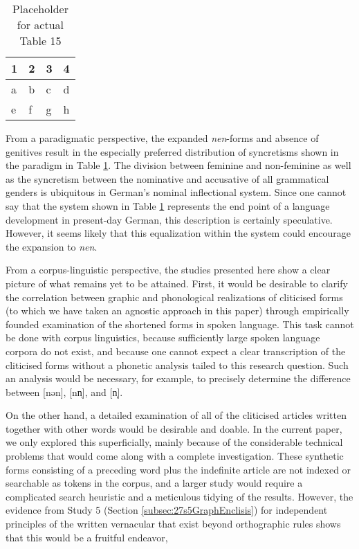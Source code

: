 \begin{table}
	\centering
	\begin{tabular}{llll}
		\toprule
		\textbf{1} & \textbf{2} & \textbf{3} & \textbf{4} \\
		\midrule
		a & b & c & d \\
		e & f & g & h \\
		\bottomrule
	\end{tabular}
	\caption{Placeholder for actual Table 15}
	\label{tab:0015}
\end{table}

From a paradigmatic perspective, the expanded \textit{nen}-forms and absence of genitives result in the especially preferred distribution of syncretisms shown in the paradigm in Table \ref{tab:0015}.
The division between feminine and non-feminine as well as the syncretism between the nominative and accusative of all grammatical genders is ubiquitous in German's nominal inflectional system.
Since one cannot say that the system shown in Table \ref{tab:0015} represents the end point of a language development in present-day German, this description is certainly speculative.
However, it seems likely that this equalization within the system could encourage the expansion to \textit{nen}.

From a corpus-linguistic perspective, the studies presented here show a clear picture of what remains yet to be attained.
First, it would be desirable to clarify the correlation between graphic and phonological realizations of cliticised forms (to which we have taken an agnostic approach in this paper) through empirically founded examination of the shortened forms in spoken language.
This task cannot be done with corpus linguistics, because sufficiently large spoken language corpora do not exist, and because one cannot expect a clear transcription of the cliticised forms without a phonetic analysis tailed to this research question.
Such an analysis would be necessary, for example, to precisely determine the difference between [nən], [nn̩], and [n̩].

On the other hand, a detailed examination of all of the cliticised articles written together with other words would be desirable and doable.
In the current paper, we only explored this superficially, mainly because of the considerable technical problems that would come along with a complete investigation.
These synthetic forms consisting of a preceding word plus the indefinite article are not indexed or searchable as tokens in the corpus, and a larger study would require a complicated search heuristic and a meticulous tidying of the results.
However, the evidence from Study 5 (Section \ref{subsec:27s5GraphEnclisis}) for independent principles of the written vernacular that exist beyond orthographic rules  shows that this would be a fruitful endeavor,



